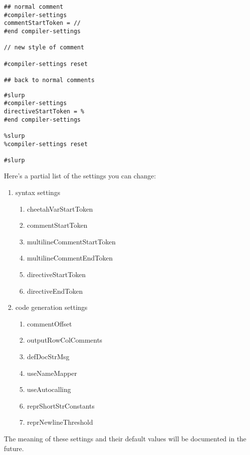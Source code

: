 \begin{verbatim}
## normal comment
#compiler-settings
commentStartToken = //
#end compiler-settings

// new style of comment

#compiler-settings reset

## back to normal comments
\end{verbatim}

\begin{verbatim}
#slurp
#compiler-settings
directiveStartToken = %
#end compiler-settings

%slurp
%compiler-settings reset

#slurp
\end{verbatim}

Here's a partial list of the settings you can change:
\begin{enumerate}
\item syntax settings
     \begin{enumerate}
     \item cheetahVarStartToken
     \item commentStartToken
     \item multilineCommentStartToken
     \item multilineCommentEndToken
     \item directiveStartToken
     \item directiveEndToken
     \end{enumerate}
\item code generation settings
     \begin{enumerate}
     \item commentOffset
     \item outputRowColComments
     \item defDocStrMsg
     \item useNameMapper
     \item useAutocalling
     \item reprShortStrConstants
     \item reprNewlineThreshold
     \end{enumerate}
\end{enumerate}
The meaning of these settings and their default values will be documented in
the future.






